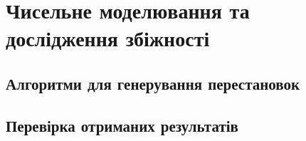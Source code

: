 \chapter{Чисельне моделювання та дослідження збіжності}
    \section{Алгоритми для генерування перестановок}
        
    \section{Перевірка отриманих результатів}
        
        
    
\newpage


    
